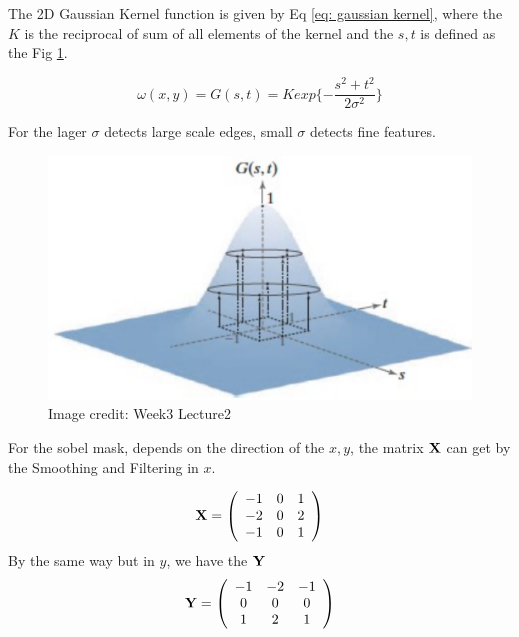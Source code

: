 \documentclass[final]{cvpr}
\begin{document}
The 2D Gaussian Kernel function is given by Eq \eqref{eq: gaussian kernel}, where the $K$ is the reciprocal of sum of all elements of the kernel and the $s,t$ is defined as the Fig \ref{fig: gaussian kernel}.

\begin{equation}
   \omega (x,y) = G(s,t)=K exp\{-\frac{s^2+t^2}{2 \sigma^2}\} \label{eq: gaussian kernel}
\end{equation} 

For the lager $\sigma$ detects large scale edges, small $\sigma$ detects fine features.

\begin{figure}[htbp]
\centering

\includegraphics[width=0.7\linewidth]{1.png}

\caption{Image credit: Week3 Lecture2}
\label{fig: gaussian kernel}
\end{figure}

For the sobel mask, depends on the direction of the $x,y$, the matrix $\bf{X}$ can get by the Smoothing and Filtering in $x$.

\begin{equation*}
      \bf{X}=\left(         
  \begin{array}{ccc}  
    -1 & 0 & 1\\  
    -2 & 0 & 2\\  
    -1 & 0 & 1 \\
  \end{array}
\right)  
\end{equation*}
By the same way but in $y$, we have the $\bf{Y}$
\begin{equation*}
      \bf{Y}=\left(         
  \begin{array}{ccc}  
    -1 & -2 & -1\\  
    0 & 0 & 0\\  
    1 & 2 & 1 \\
  \end{array}
\right)  
\end{equation*}
\end{document}
